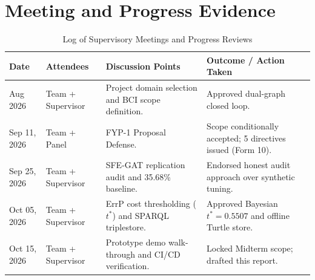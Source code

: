 \documentclass[12pt,a4paper]{report}
\begin{document}
\chapter{Meeting and Progress Evidence}
\label{app:meetings}
\begin{table}[H]
\centering
\small
\caption{Log of Supervisory Meetings and Progress Reviews}
\label{tab:meetings}
\begin{tabularx}{\textwidth}{p{2.2cm} p{2.8cm} p{4.6cm} X}
\toprule
\textbf{Date} & \textbf{Attendees} & \textbf{Discussion Points} & \textbf{Outcome / Action Taken} \\
\midrule
Aug 2026 & Team + Supervisor & Project domain selection and BCI scope definition. & Approved dual-graph closed loop. \\
\addlinespace
Sep 11, 2026 & Team + Panel & FYP-1 Proposal Defense. & Scope conditionally accepted; 5 directives issued (Form 10). \\
\addlinespace
Sep 25, 2026 & Team + Supervisor & SFE-GAT replication audit and 35.68\% baseline. & Endorsed honest audit approach over synthetic tuning. \\
\addlinespace
Oct 05, 2026 & Team + Supervisor & ErrP cost thresholding ($t^*$) and SPARQL triplestore. & Approved Bayesian $t^* = 0.5507$ and offline Turtle store. \\
\addlinespace
Oct 15, 2026 & Team + Supervisor & Prototype demo walk-through and CI/CD verification. & Locked Midterm scope; drafted this report. \\
\bottomrule
\end{tabularx}
\end{table}
\end{document}
